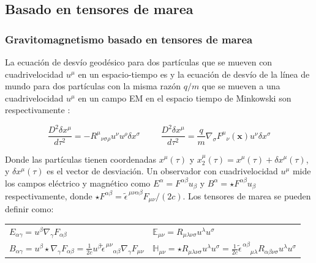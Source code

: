 \documentclass[aspectratio=169,10pt,usenames,dvipsnames,spanish]{beamer}
\newcommand{\ve}[1]{\mathbf{#1}}    %
\begin{document}
\subsection{Basado en tensores de marea}
\begin{frame}
\frametitle{Gravitomagnetismo basado en tensores de marea}
La ecuación de desvío geodésico para dos partículas que se mueven con cuadrivelocidad $u^{\mu}$ en un espacio-tiempo es y la ecuación de desvío de la línea de mundo para dos partículas con la misma razón $q/m$ que se mueven a una cuadrivelocidad $u^{\mu}$ en un campo EM en el espacio tiempo de Minkowski son respectivamente \parencite{Costa2006}:

\begin{equation}\label{Ecuacion de desvio geodesico}
    \frac{D^2\delta x^{\mu}}{d\tau^2}=-R^\mu{}_{\nu\sigma\rho}u^{\nu}u^{\rho}\delta x^{\sigma} \hspace{1cm}     \frac{D^2 \delta x^{\mu}}{d\tau^2}=\frac{q}{m}\nabla_{\sigma}F^{\mu}{}_{\nu}(\ve{x})u^{\nu}\delta x^{\sigma}
\end{equation}

Donde las partículas tienen coordenadas $x^\mu(\tau)$ y $x^\mu_2(\tau)=x^{\mu}(\tau)+\delta x^{\mu}(\tau)$, y $\delta x^{\mu}(\tau)$ es el vector de desviación. Un observador con cuadrivelocidad $u^\mu$  mide los campos eléctrico y magnético como $E^{\alpha}=F^{\alpha\beta}u_{\beta}$ y $B^{\alpha}=\star F^{\alpha\beta}u_{\beta}$ respectivamente, donde $\star F^{\alpha \beta}=\tilde{\epsilon}^{\,\mu\nu\alpha\beta}F_{\mu\nu}/(2c)$. Los tensores de marea se pueden definir como:

\begin{center}
\renewcommand{\arraystretch}{1.0} %
\setlength{\tabcolsep}{5pt} %

\begin{tabular}{p{}|p{}} %
$E_{\alpha\gamma}=u^{\beta}\nabla_{\gamma}F_{\alpha\beta}$
& 
$\mathbb{E}_{\mu\nu}=R_{\mu\lambda\nu\sigma}u^{\lambda}u^{\sigma}$\\[0.2cm]
$B_{\alpha\gamma}=u^{\beta}\star\nabla_{\gamma}F_{\alpha\beta}=\frac{1}{2c}u^{\beta}\tilde{\epsilon}^{\,\mu\nu}{}_{\alpha\beta}\nabla_{\gamma}F_{\mu\nu}$ 
& 
$\mathbb{H}_{\mu\nu}=\star R_{\mu\lambda\nu\sigma}u^{\lambda}u^{\sigma}=\frac{1}{2c}\tilde{\epsilon}^{\,\alpha\beta}{}_{\mu\lambda}R_{\alpha\beta\nu\sigma}u^{\lambda}u^{\sigma}$
\end{tabular}
\end{center}

    
\end{frame}
\end{document}
